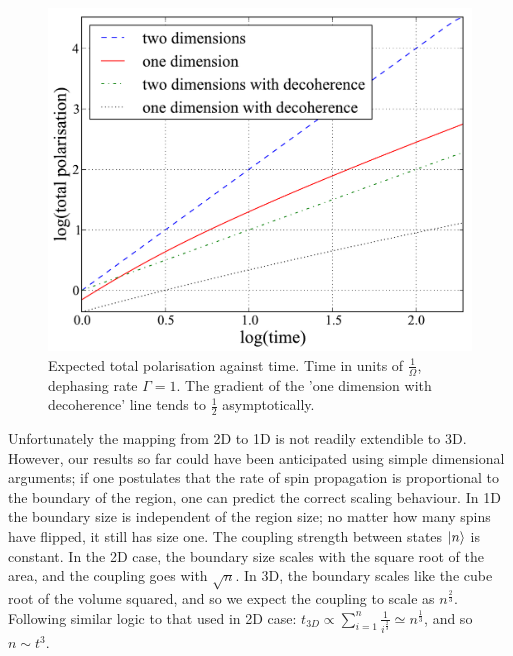 \begin{figure}
\includegraphics[scale=0.5]{assets/comparison.pdf}
\caption{Expected total polarisation against time. Time in units of
  $\frac{1}{\Omega}$, dephasing rate $\Gamma = 1$. The gradient of the
    'one dimension with decoherence' line tends to $\frac{1}{2}$ asymptotically.}
    \label{comparison}
    \end{figure}




    Unfortunately the mapping from 2D to 1D is not readily extendible to 3D. However, our results so far could have been anticipated using simple dimensional arguments; if one postulates that the rate of spin propagation is proportional to the boundary of the region, one can predict the correct scaling behaviour. In 1D the boundary size is independent of the region size; no matter how many spins have flipped, it still has size one. The coupling strength between states $\left\vert n\right\rangle$ is constant. In the 2D case, the boundary size scales with the square root of the area, and the coupling goes with $\sqrt{n}$. In 3D, the boundary scales like the cube root of the volume squared, and so we expect the coupling to scale as $n^{\frac{2}{3}}$. Following similar logic to that used in 2D case: $t_{3D}\propto \sum_{i=1}^{n}\frac{1}{i^\frac{2}{3}}\simeq n^{\frac{1}{3}}$, and so $n \sim t^3$.  


